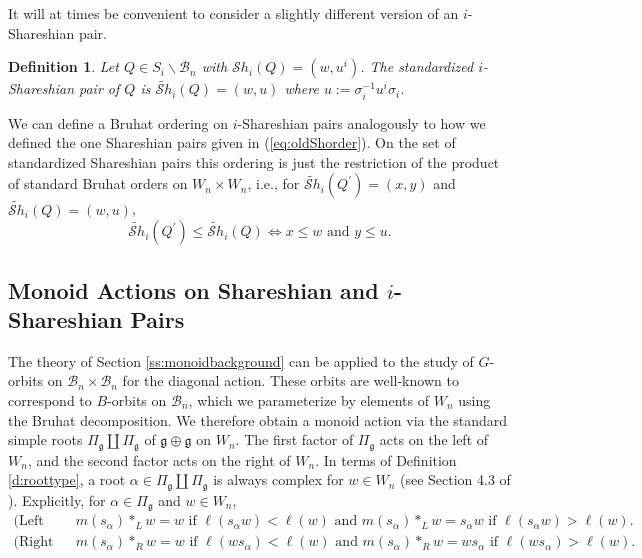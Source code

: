 \documentclass[12pt]{amsart}
\numberwithin{equation}{section}
\newtheorem{rem}[thm]{Remark}
\newtheorem{dfn}[thm]{Definition}
\newcommand{\Wn}{{W}_n}
\newcommand{\fg}{\mbox{${\mathfrak g}$}}
\newcommand{\B}{\mathcal{B}}
\newcommand{\Sh}{\mathcal{S}h}
\begin{document}
  It will at times be convenient to consider a slightly different version of an $i$-Shareshian pair. 
 \begin{dfn}\label{d:istd}
 Let $Q\in S_{i}\backslash\B_{n}$ with $\Sh_{i}(Q)=(w, u^{i})$.  The \emph{standardized} $i$-Shareshian pair of $Q$ is $\widetilde{\Sh}_{i}(Q)=(w, u)$ where $u:=\sigma_{i}^{-1}u^{i}\sigma_{i}$. 
 \end{dfn}
 We can define a Bruhat ordering on $i$-Shareshian pairs analogously to how we defined the one Shareshian pairs given in (\ref{eq:oldShorder}).  On the set of standardized Shareshian pairs this ordering is just the restriction of the product of standard Bruhat orders on $\Wn\times \Wn$, i.e., for $\widetilde{\Sh}_{i}(Q^{\prime})=(x,y)$ and $\widetilde{\Sh}_{i}(Q)=(w,u)$,
 \begin{equation}\label{eq:istdShorder}
 \widetilde{\Sh}_{i}(Q^{\prime})\leq \widetilde{\Sh}_{i}(Q)\Leftrightarrow x\leq w \mbox{ and } y\leq u. 
 \end{equation}
 
 \subsection{Monoid Actions on Shareshian and $i$-Shareshian Pairs}
 \label{ss:monoidSh}
 The theory of Section \ref{ss:monoidbackground} can be applied to the study of $G$-orbits 
 on $\B_{n}\times\B_{n}$ for the diagonal action.  These orbits are well-known to  correspond to $B$-orbits on $\B_{n}$, which we parameterize by elements of $W_{n}$ using the Bruhat decomposition.  We therefore obtain a monoid action via the standard simple roots $\Pi_{\fg}\coprod\Pi_{\fg}$ of $\fg\oplus\fg$ on $\Wn.$  The first factor of $\Pi_{\fg}$ acts on the left of $\Wn$, and the second factor acts on the right of $\Wn$.  In terms of Definition \ref{d:roottype}, a root $\alpha\in\Pi_{\fg}\coprod \Pi_{\fg}$ is always complex for $w\in \Wn$ (see Section 4.3 of \cite{Shpairs}).  Explicitly, for $\alpha \in \Pi_{\fg}$ and $w\in \Wn$,
 \begin{equation}\label{eq:Wmonoidact}
\begin{split}
\mbox{(Left Action) } &m(s_{\alpha})*_{L} w=w \mbox{ if } \ell(s_{\alpha}w)<\ell(w) \mbox{ and } m(s_{\alpha})*_{L}w=s_{\alpha}w\mbox{ if } \ell(s_{\alpha}w)>\ell(w).\\
\mbox{(Right Action) } &m(s_{\alpha})*_{R}w=w \mbox{ if } \ell(ws_{\alpha})<\ell(w) \mbox{ and } m(s_{\alpha})*_{R}w=ws_{\alpha}\mbox{ if } \ell(ws_{\alpha})>\ell(w).\\
\end{split}
\end{equation}
\end{document}
